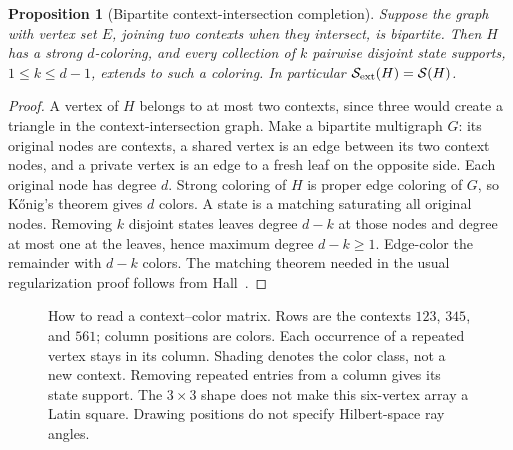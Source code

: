 \documentclass[aps,pra,reprint,superscriptaddress,longbibliography,nofootinbib,floatfix,10pt]{revtex4-2}
\newtheorem{proposition}[theorem]{Proposition}
\theoremstyle{definition}\newtheorem{definition}[theorem]{Definition}
\theoremstyle{remark}\newtheorem{remark}[theorem]{Remark}
\newcommand{\Sc}{\mathcal S}\newcommand{\Cc}{\mathcal C}
\begin{document}
\begin{proposition}[Bipartite context-intersection completion]\label{prop:bipartite-completion}
Suppose the graph with vertex set $E$, joining two contexts when they intersect, is bipartite. Then $H$ has a strong $d$-coloring, and every collection of $k$ pairwise disjoint state supports, $1\le k\le d-1$, extends to such a coloring. In particular $\Sc_{\rm ext}(H)=\Sc(H)$.
\end{proposition}
\begin{proof}
A vertex of $H$ belongs to at most two contexts, since three would create a triangle in the context-intersection graph. Make a bipartite multigraph $G$: its original nodes are contexts, a shared vertex is an edge between its two context nodes, and a private vertex is an edge to a fresh leaf on the opposite side. Each original node has degree $d$. Strong coloring of $H$ is proper edge coloring of $G$, so K\H{o}nig's theorem gives $d$ colors. A state is a matching saturating all original nodes. Removing $k$ disjoint states leaves degree $d-k$ at those nodes and degree at most one at the leaves, hence maximum degree $d-k\ge1$. Edge-color the remainder with $d-k$ colors. The matching theorem needed in the usual regularization proof follows from Hall~\cite{hall1935representatives}.
\end{proof}

\begin{figure}[t]
\centering
{}
\caption{How to read a context--color matrix. Rows are the contexts $123$, $345$, and $561$; column positions are colors. Each occurrence of a repeated vertex stays in its column. Shading denotes the color class, not a new context. Removing repeated entries from a column gives its state support. The $3\times3$ shape does not make this six-vertex array a Latin square. Drawing positions do not specify Hilbert-space ray angles.}\label{fig:matrix-reading}
\end{figure}
\end{document}

